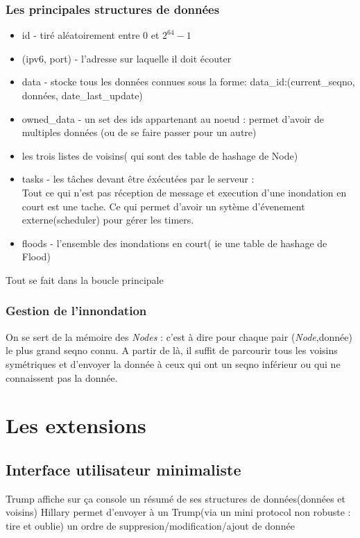 \documentclass{article}
\begin{document}
\subsubsection{Les principales structures de données}
\begin{itemize}
 \item id - tiré aléatoirement entre 0 et $2^{64}-1$
 \item (ipv6, port) - l'adresse sur laquelle il doit écouter
 \item data - stocke tous les données connues sous la forme:
  {data\_id:(current\_seqno, données, date\_last\_update)}
 \item owned\_data - un set des ids appartenant au noeud : 
 permet d'avoir de multiples données (ou de se faire passer pour un autre)
 \item les trois listes de voisins( qui sont des table de hashage de Node)
 \item tasks - les tâches devant être éxécutées par le serveur :\\
 Tout ce qui n'est pas réception de message et execution d'une inondation en court est une tache.
 Ce qui permet d'avoir un sytème d'évenement externe(scheduler) pour gérer les timers.
 \item floods - l'ensemble des inondations en court( ie une table de hashage de Flood)
\end{itemize}

Tout se fait dans la boucle principale

\subsubsection{Gestion de l'innondation}
On se sert de la mémoire des \textit{Nodes} : c'est à dire pour chaque pair (\textit{Node},donnée) le plus 
grand seqno connu. A partir de là, il suffit de parcourir tous les voisins 
symétriques et d'envoyer la donnée à ceux qui ont un seqno inférieur ou qui ne connaissent pas la donnée.

\section{Les extensions}
\subsection{Interface utilisateur minimaliste}
Trump affiche sur ça console un résumé de ses structures de données(données et voisins)
Hillary permet d'envoyer à un Trump(via un mini protocol non robuste : tire et oublie) 
un ordre de suppresion/modification/ajout de donnée
\end{document}
